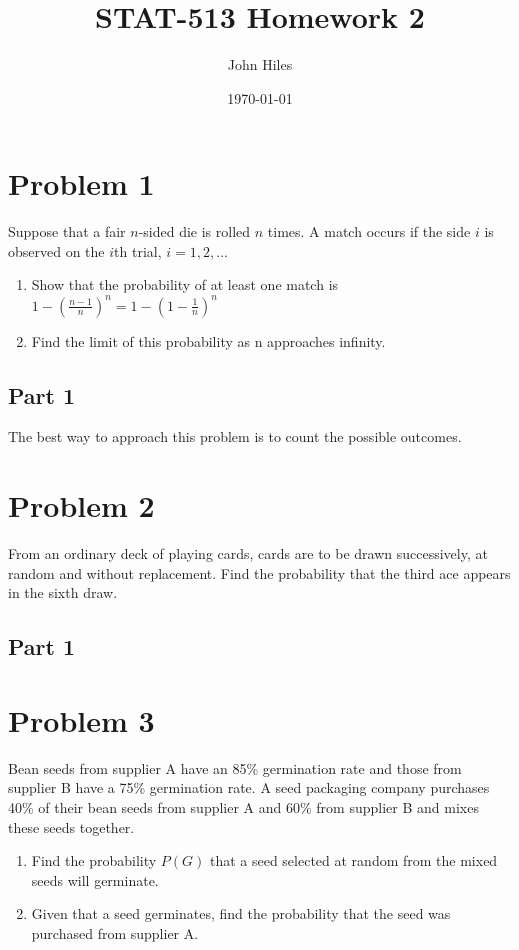 \documentclass{article}
\title{STAT-513 Homework 2}
\author{John Hiles}
\date\today
\begin{document}
\maketitle %


\section*{Problem 1}
Suppose that a fair $n$-sided die is rolled $n$ times. A match occurs if the side $i$ is observed on the $i$th trial, $i=1,2,...$
\begin{enumerate}
\item
Show that the probability of at least one match is $1-(\frac{n-1}{n})^n = 1-(1-\frac{1}{n})^n$
\item
Find the limit of this probability as n approaches infinity.
\end{enumerate}

\subsection*{Part 1}
The best way to approach this problem is to count the possible outcomes. 

\clearpage

\section*{Problem 2}
From an ordinary deck of playing cards, cards are to be drawn successively, at random and without replacement. Find the probability that the third ace appears in the sixth draw.


\subsection*{Part 1}
\clearpage
\section*{Problem 3}
Bean seeds from supplier A have an 85\% germination rate and those from supplier B have a 75\% germination rate. A seed packaging company purchases 40\% of their bean seeds from supplier A and 60\% from supplier B and mixes these seeds together.
\begin{enumerate}


\item
Find the probability $P(G)$ that a seed selected at random from the mixed seeds will germinate.
\item
Given that a seed germinates, find the probability that the seed was purchased from supplier A.
\end{enumerate}
\end{document}
